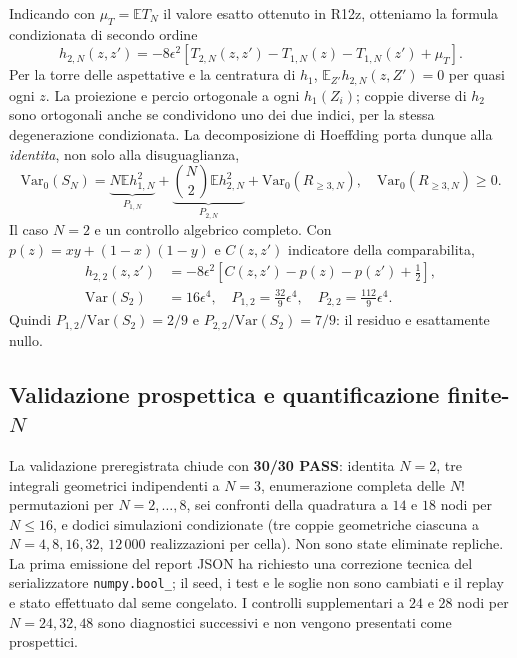 \documentclass[11pt,a4paper]{article}
\begin{document}
Indicando con $\mu_T=\mathbb E T_N$ il valore esatto ottenuto in R12z, otteniamo la formula condizionata di secondo ordine
\begin{equation}
 \boxed{h_{2,N}(z,z')=-8\epsilon^2[T_{2,N}(z,z')-T_{1,N}(z)-T_{1,N}(z')+\mu_T].}
 \label{eq:r12af_h2}
\end{equation}
Per la torre delle aspettative e la centratura di $h_1$, $\mathbb E_{Z'}h_{2,N}(z,Z')=0$ per quasi ogni $z$. La proiezione e percio ortogonale a ogni $h_1(Z_i)$; coppie diverse di $h_2$ sono ortogonali anche se condividono uno dei due indici, per la stessa degenerazione condizionata. La decomposizione di Hoeffding porta dunque alla \emph{identita}, non solo alla disuguaglianza,
\begin{equation}
 \boxed{\mathrm{Var}_0(S_N)=\underbrace{N\mathbb E h_{1,N}^2}_{P_{1,N}}
 +\underbrace{\binom N2\mathbb E h_{2,N}^2}_{P_{2,N}}
 +\mathrm{Var}_0(R_{\ge3,N}),\quad \mathrm{Var}_0(R_{\ge3,N})\ge0.}
 \label{eq:r12af_var_decomposition}
\end{equation}
Il caso $N=2$ e un controllo algebrico completo. Con $p(z)=xy+(1-x)(1-y)$ e $C(z,z')$ indicatore della comparabilita,
\begin{align}
 h_{2,2}(z,z')&=-8\epsilon^2[C(z,z')-p(z)-p(z')+\tfrac12],\\
 \mathrm{Var}(S_2)&=16\epsilon^4,\quad P_{1,2}=\tfrac{32}{9}\epsilon^4,\quad
 P_{2,2}=\tfrac{112}{9}\epsilon^4.
 \label{eq:r12af_N2}
\end{align}
Quindi $P_{1,2}/\mathrm{Var}(S_2)=2/9$ e $P_{2,2}/\mathrm{Var}(S_2)=7/9$: il residuo e esattamente nullo.

\subsection{Validazione prospettica e quantificazione finite-$N$}

La validazione preregistrata chiude con \textbf{30/30 PASS}: identita $N=2$, tre integrali geometrici indipendenti a $N=3$, enumerazione completa delle $N!$ permutazioni per $N=2,\ldots,8$, sei confronti della quadratura a $14$ e $18$ nodi per $N\le16$, e dodici simulazioni condizionate (tre coppie geometriche ciascuna a $N=4,8,16,32$, $12\,000$ realizzazioni per cella). Non sono state eliminate repliche. La prima emissione del report JSON ha richiesto una correzione tecnica del serializzatore \texttt{numpy.bool\_}; il seed, i test e le soglie non sono cambiati e il replay e stato effettuato dal seme congelato. I controlli supplementari a $24$ e $28$ nodi per $N=24,32,48$ sono diagnostici successivi e non vengono presentati come prospettici.
\end{document}
